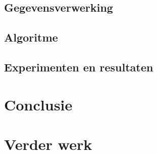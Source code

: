 \documentclass{article}
\begin{document}
\subsection{Gegevensverwerking}


\subsection{Algoritme}


\subsection{Experimenten en resultaten}


\section{Conclusie}


\section{Verder werk}








\end{document}
